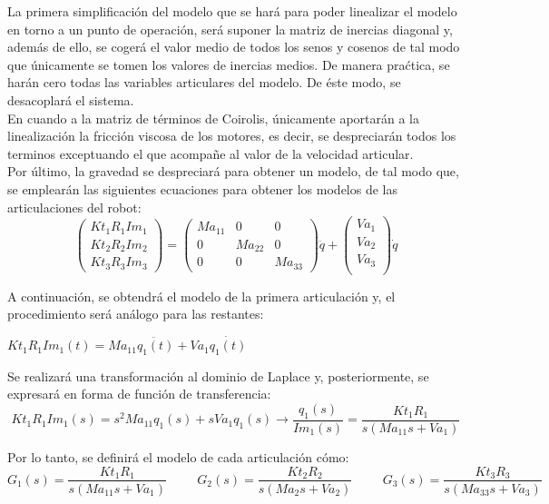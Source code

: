 La primera simplificación del modelo que se hará para poder linealizar el modelo en torno a un punto de operación, será suponer la matriz de inercias diagonal y, además de ello, se cogerá el valor medio de todos los senos y cosenos de tal modo que únicamente se tomen los valores de inercias medios. De manera praćtica, se harán cero todas las variables articulares del modelo. De éste modo, se desacoplará el sistema.\\
En cuando a la matriz de términos de Coirolis, únicamente aportarán a la linealización la fricción viscosa de los motores, es decir, se despreciarán todos los terminos exceptuando el que acompañe al valor de la velocidad articular.\\
Por último, la gravedad se despreciará para obtener un modelo, de tal modo que, se emplearán las siguientes ecuaciones para obtener los modelos de las articulaciones del robot:
\begin{equation}
	\begin{pmatrix}
	Kt_{1}R_{1}Im_{1}  \\
	Kt_{2}R_{2}Im_{2}  \\
	Kt_{3}R_{3}Im_{3}
	\end{pmatrix} =
	\begin{pmatrix}
	Ma_{11} & 0 	  & 0  \\
		0   & Ma_{22} & 0  \\
		0   & 0   	  & Ma_{33}
	\end{pmatrix}
	\ddot{q}+
	\begin{pmatrix}
	Va_{1} \\
	Va_{2} \\
	Va_{3} \\
	\end{pmatrix}
	\dot{q}
\end{equation}

A continuación, se obtendrá el modelo de la primera articulación y, el procedimiento será análogo para las restantes:
\begin{center}
	$Kt_{1}R_{1}Im_{1}(t)=Ma_{11}\ddot{q_{1}(t)} + Va_{1}\dot{q_{1}(t)}$
\end{center}
Se realizará una transformación al dominio de Laplace y, posteriormente, se expresará en forma de función de transferencia:
\begin{equation}
	Kt_{1}R_{1}Im_{1}(s)=s^{2}Ma_{11}q_{1}(s) + sVa_{1}q_{1}(s) \rightarrow \frac{q_{1}(s)}{Im_{1}(s)}=\frac{Kt_{1}R_{1}}{s(Ma_{11}s+Va_{1})}
\end{equation}

Por lo tanto, se definirá el modelo de cada articulación cómo:
\begin{equation}
	G_{1}(s)=\frac{Kt_{1}R_{1}}{s(Ma_{11}s+Va_{1})} \hspace{1cm} G_{2}(s)=\frac{Kt_{2}R_{2}}{s(Ma_{2}s+Va_{2})} \hspace{1cm} G_{3}(s)=\frac{Kt_{3}R_{3}}{s(Ma_{33}s+Va_{3})}
\end{equation}

